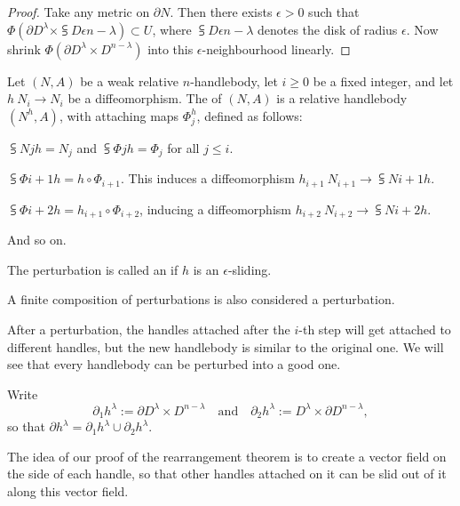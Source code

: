 \begin{proof}
    Take any metric on $\partial N$.
    Then there exists $\epsilon>0$
    such that $\Phi(\partial D^\lambda\times\subsup D\epsilon{n-\lambda})\subset U$,
    where $\subsup D\epsilon{n-\lambda}$ denotes the disk of radius $\epsilon$.
    Now shrink $\Phi(\partial D^\lambda\times D^{n-\lambda})$ into this $\epsilon$-neighbourhood linearly.
\end{proof}

\begin{definition}
    Let $(N,A)$ be a weak relative $n$-handlebody,
    let $i\geq0$ be a fixed integer,
    and let $h\:N_i\to N_i$ be a diffeomorphism.
    The  of $(N,A)$ is a relative handlebody $(N^h,A)$,
    with attaching maps $\Phi^h_j$, defined as follows:
    \begin{itms}
        \item $\subsup Njh=N_j$ and $\subsup\Phi jh=\Phi_j$ for all $j\leq i$.
        \item $\subsup\Phi{i+1}h=h\circ\Phi_{i+1}$. 
        This induces a diffeomorphism $h_{i+1}\:N_{i+1}\to\subsup N{i+1}h$.
        \item $\subsup\Phi{i+2}h=h_{i+1}\circ\Phi_{i+2}$,
        inducing a diffeomorphism $h_{i+2}\:N_{i+2}\to\subsup N{i+2}h$.
        \item And so on.
    \end{itms}
    The perturbation is called an  if $h$ is an $\epsilon$-sliding.
    
    A finite composition of perturbations
    is also considered a perturbation. \varqed
\end{definition}

After a perturbation, the handles attached after the $i$-th step
will get attached to different handles,
but the new handlebody is similar to the original one.
We will see that every handlebody can be perturbed into a good one.

\begin{notation}
    Write
    \[ \partial_1h^\lambda := \partial D^\lambda \times D^{n-\lambda}
    \quad\text{and}\quad
    \partial_2h^\lambda := D^\lambda \times \partial D^{n-\lambda}, \]
    so that $\partial h^\lambda = \partial_1h^\lambda \cup \partial_2h^\lambda$.
    \varqed
\end{notation}

The idea of our proof of the rearrangement theorem 
is to create a vector field on the side of each handle,
so that other handles attached on it
can be slid out of it along this vector field.

